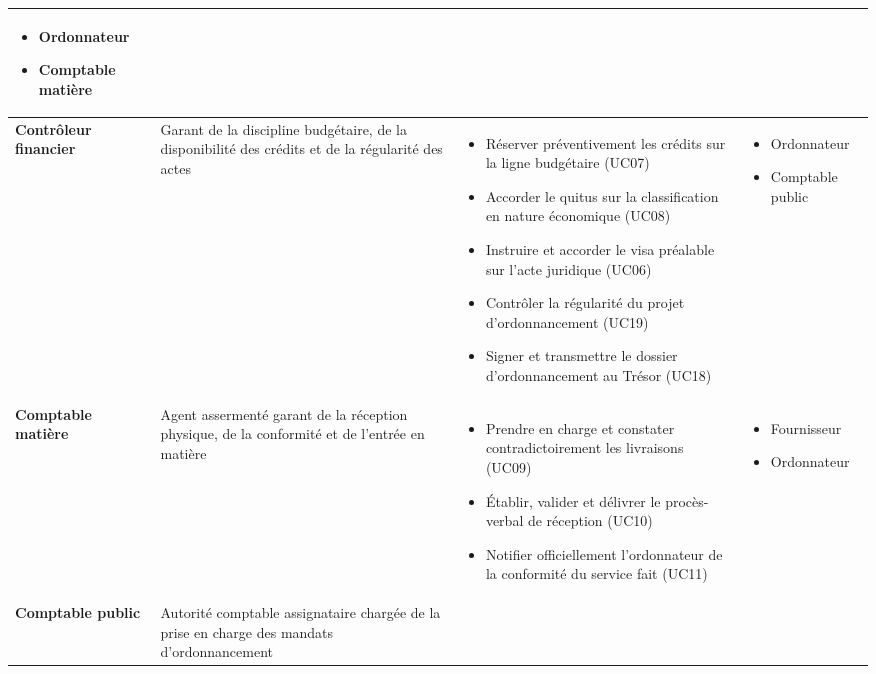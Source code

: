 \documentclass[11pt,a4paper]{article}
\begin{document}
\begin{center}
\begin{tabularx}{\linewidth}{L{2.4cm} L{3.1cm} Y L{2.7cm}}
\begin{itemize}[leftmargin=1.0em, nosep]
  \item Ordonnateur
  \item Comptable matière
\end{itemize} \\
\midrule
{}
\textbf{Contrôleur financier} &
Garant de la discipline budgétaire, de la disponibilité des crédits et de la régularité des actes &
\begin{itemize}[leftmargin=1.0em, nosep]
  \item Réserver préventivement les crédits sur la ligne budgétaire (UC07)
  \item Accorder le quitus sur la classification en nature économique (UC08)
  \item Instruire et accorder le visa préalable sur l'acte juridique (UC06)
  \item Contrôler la régularité du projet d'ordonnancement (UC19)
  \item Signer et transmettre le dossier d'ordonnancement au Trésor (UC18)
\end{itemize} &
\begin{itemize}[leftmargin=1.0em, nosep]
  \item Ordonnateur
  \item Comptable public
\end{itemize} \\
\midrule
\textbf{Comptable matière} &
Agent assermenté garant de la réception physique, de la conformité et de l'entrée en matière &
\begin{itemize}[leftmargin=1.0em, nosep]
  \item Prendre en charge et constater contradictoirement les livraisons (UC09)
  \item Établir, valider et délivrer le procès-verbal de réception (UC10)
  \item Notifier officiellement l'ordonnateur de la conformité du service fait (UC11)
\end{itemize} &
\begin{itemize}[leftmargin=1.0em, nosep]
  \item Fournisseur
  \item Ordonnateur
\end{itemize} \\
\midrule
{}
\textbf{Comptable public} &
Autorité comptable assignataire chargée de la prise en charge des mandats d'ordonnancement &
\begin{itemize}[leftmargin=1.0em, nosep]

\end{itemize}
\end{tabularx}
\end{center}
\end{document}
